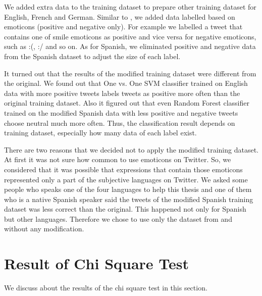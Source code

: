 We added extra data to the training dataset to prepare other training dataset for English, French and German.
Similar to \cite{dataset}, we added data labelled based on emoticons (positive and negative only).
For example we labelled a tweet that contains one of smile emoticons as positive and vice versa for negative emoticons, such as :(, :/ and so on.
As for Spanish, we eliminated positive and negative data from the Spanish dataset to adjust the size of each label. 

It turned out that the results of the modified training dataset were different from the original.
We found out that One vs. One SVM classifier trained on English data with more positive tweets labels tweets as positive more often than the original training dataset. 
Also it figured out that even Random Forest classifier trained on the modified Spanish data with less positive and negative tweets choose neutral much more often.
Thus, the classification result depends on training dataset, especially how many data of each label exist.

There are two reasons that we decided not to apply the modified training dataset.
At first it was not sure how common to use emoticons on Twitter.
So, we considered that it was possible that expressions that contain those emoticons represented only a part of the subjective languages on Twitter.
We asked some people who speaks one of the four languages to help this thesis and one of them who is a native Spanish speaker said the tweets of the modified Spanish training dataset was less correct than the original. 
This happened not only for Spanish but other languages.
Therefore we chose to use only the dataset from \cite{dataset} and \cite{dataset_spanish} without any modification.


\section{Result of Chi Square Test}
We discuss about the results of the chi square test in this section.

